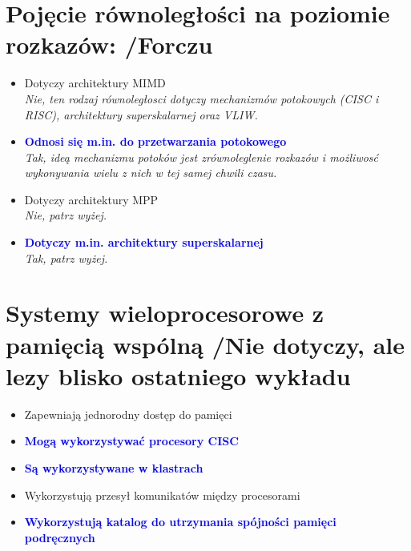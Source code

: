 \section{Pojęcie równoległości na poziomie rozkazów: {\small /Forczu}}
	\begin{itemize}
    \item Dotyczy architektury MIMD\\
    {\small \emph{Nie, ten rodzaj równoległosci dotyczy mechanizmów potokowych (CISC i RISC), architektury superskalarnej oraz VLIW.}}
    \item \textcolor{Blue}{\textbf{Odnosi się m.in. do przetwarzania potokowego}}\\
    {\small \emph{Tak, ideą mechanizmu potoków jest zrównoleglenie rozkazów i możliwosć wykonywania wielu z nich w tej samej chwili czasu.}}
    \item Dotyczy architektury MPP\\
    {\small \emph{Nie, patrz wyżej.}}
    \item \textcolor{Blue}{\textbf{Dotyczy m.in. architektury superskalarnej}}\\
    {\small \emph{Tak, patrz wyżej.}}
    \end{itemize}

\section{Systemy wieloprocesorowe z pamięcią wspólną {\small /Nie dotyczy, ale lezy blisko ostatniego wykładu}}
	\begin{itemize}
    \item Zapewniają jednorodny dostęp do pamięci
    \item \textcolor{Blue}{\textbf{Mogą wykorzystywać procesory CISC}}
    \item \textcolor{Blue}{\textbf{Są wykorzystywane w klastrach}}
    \item Wykorzystują przesył komunikatów między procesorami
    \item \textcolor{Blue}{\textbf{Wykorzystują katalog do utrzymania spójności pamięci podręcznych}}
    \end{itemize}


